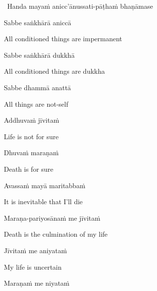 \begin{leader}
  \anglebracketleft\ \hspace{-0.5mm}Handa mayaṁ anicc'ānussati-pāṭhaṁ bhaṇāmase \hspace{-0.5mm}\anglebracketright\
\end{leader}

Sabbe saṅkhārā aniccā

\begin{english}
  All conditioned things are impermanent
\end{english}

Sabbe saṅkhārā dukkhā

\begin{english}
  All conditioned things are dukkha
\end{english}

Sabbe dhammā anattā

\begin{english}
  All things are not-self\ifdigital\makeatletter\hyperlink{endnote104-appendix}\makeatother\fi
\end{english}

\suttaRef{[Dhp 277-279]}

Addhuvaṁ jīvitaṁ

\begin{english}
  Life is not for sure
\end{english}

Dhuvaṁ maraṇaṁ

\begin{english}
  Death is for sure
\end{english}

Avassaṁ mayā maritabbaṁ

\begin{english}
  It is inevitable that I'll die
\end{english}

Maraṇa-pariyosānaṁ me jīvitaṁ

\begin{english}
  Death is the culmination of my life
\end{english}

Jīvitaṁ me aniyataṁ

\begin{english}
  My life is uncertain
\end{english}

Maraṇaṁ me niyataṁ

